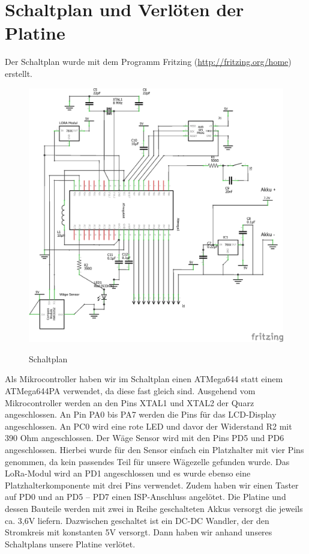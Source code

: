 \chapter{Schaltplan und Verlöten der Platine}
Der Schaltplan wurde mit dem Programm Fritzing (\url{http://fritzing.org/home}) erstellt.
\begin{figure}[ht]
    \center
    \includegraphics[width=15cm]{Bilder/schaltplan-1.png}\\
    \caption{Schaltplan}
    \label{fig:schaltplan}
\end{figure}
\newpage
Als Mikrocontroller haben wir im Schaltplan einen ATMega644 statt einem ATMega644PA verwendet, da diese fast gleich sind. Ausgehend vom Mikrocontroller werden an den Pins XTAL1 und XTAL2 der Quarz angeschlossen. An Pin PA0 bis PA7 werden die Pins für das LCD-Display angeschlossen. An PC0 wird eine rote LED und davor der Widerstand R2 mit 390 Ohm angeschlossen. Der Wäge Sensor wird mit den Pins PD5 und PD6 angeschlossen. Hierbei wurde für den Sensor einfach ein Platzhalter mit vier Pins genommen, da kein passendes Teil für unsere Wägezelle gefunden wurde. Das LoRa-Modul wird an PD1 angeschlossen und es wurde ebenso eine Platzhalterkomponente mit drei Pins verwendet. Zudem haben wir einen Taster auf PD0 und an PD5 – PD7 einen ISP-Anschluss angelötet. Die Platine und dessen Bauteile werden mit zwei in Reihe geschalteten Akkus versorgt die jeweils ca. 3,6V liefern. Dazwischen geschaltet ist ein DC-DC Wandler, der den Stromkreis mit konstanten 5V versorgt. Dann haben wir anhand unseres Schaltplans unsere Platine verlötet.\\

